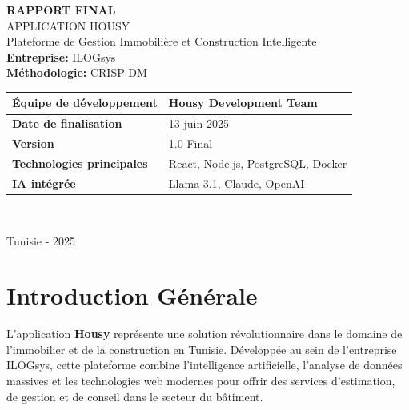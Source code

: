 \documentclass[12pt,a4paper]{report}
\begin{document}
\begin{titlepage}
    \centering
    \vspace*{1cm}
    
    
    {\huge\bfseries RAPPORT FINAL}\\[0.5cm]
    {\LARGE APPLICATION HOUSY}\\[0.5cm]
    {\large Plateforme de Gestion Immobilière et Construction Intelligente}\\[2cm]
    
    {\Large\textbf{Entreprise:} ILOGsys}\\[0.5cm]
    {\Large\textbf{Méthodologie:} CRISP-DM}\\[2cm]
    
    \begin{tabular}{|l|l|}
        \hline
        \textbf{Équipe de développement} & Housy Development Team \\
        \hline
        \textbf{Date de finalisation} & 13 juin 2025 \\
        \hline
        \textbf{Version} & 1.0 Final \\
        \hline
        \textbf{Technologies principales} & React, Node.js, PostgreSQL, Docker \\
        \hline
        \textbf{IA intégrée} & Llama 3.1, Claude, OpenAI \\
        \hline
    \end{tabular}\\[2cm]
    
    \vfill
    
    {\large Tunisie - 2025}
\end{titlepage}

\tableofcontents
\newpage

\listoffigures
\newpage

\listoftables
\newpage

\chapter*{Introduction Générale}

L'application \textbf{Housy} représente une solution révolutionnaire dans le domaine de l'immobilier et de la construction en Tunisie. Développée au sein de l'entreprise ILOGsys, cette plateforme combine l'intelligence artificielle, l'analyse de données massives et les technologies web modernes pour offrir des services d'estimation, de gestion et de conseil dans le secteur du bâtiment.
\end{document}
